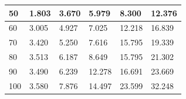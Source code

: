 \begin{table}[H]
\begin{tabular}{|l|l|l|l|l|l|}
50                               & 1.803           & 3.670            & 5.979            & 8.300            & 12.376           \\ \hline
60                               & 3.005           & 4.927            & 7.025            & 12.218           & 16.839           \\ \hline
70                               & 3.420           & 5.250            & 7.616            & 15.795           & 19.339           \\ \hline
80                               & 3.513           & 6.187            & 8.649            & 15.795           & 21.302           \\ \hline
90                               & 3.490           & 6.239            & 12.278           & 16.691           & 23.669           \\ \hline
100                              & 3.580           & 7.876            & 14.497           & 23.599           & 32.248           \\ \hline
\end{tabular}
\end{table}

